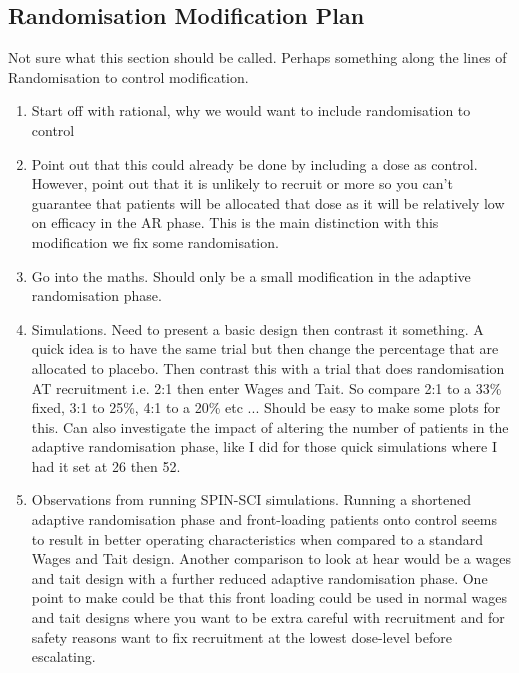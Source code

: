 
\subsection{Randomisation Modification Plan}
Not sure what this section should be called. Perhaps something along the lines of Randomisation to control modification. 

\begin{enumerate}
	\item Start off with rational, why we would want to include randomisation to control 
	\item Point out that this could already be done by including a dose as control. However, point out that it is unlikely to recruit or more so you can't guarantee that patients will be allocated that dose as it will be relatively low on efficacy in the AR phase. This is the main distinction with this modification we fix some randomisation. 
	\item Go into the maths. Should only be a small modification in the adaptive randomisation phase. 
	\item Simulations. Need to present a basic design then contrast it something. A quick idea is to have the same trial but then change the percentage that are allocated to placebo. Then contrast this with a trial that does randomisation AT recruitment i.e. 2:1 then enter Wages and Tait. So compare 2:1 to a 33\% fixed, 3:1 to 25\%, 4:1 to a 20\% etc ... Should be easy to make some plots for this. Can also investigate the impact of altering the number of patients in the adaptive randomisation phase, like I did for those quick simulations where I had it set at 26 then 52. 
	\item Observations from running SPIN-SCI simulations. Running a shortened adaptive randomisation phase and front-loading patients onto control seems to result in better operating characteristics when compared to a standard Wages and Tait design. Another comparison to look at hear would be a wages and tait design with a further reduced adaptive randomisation phase. One point to make could be that this front loading could be used in normal wages and tait designs where you want to be extra careful with recruitment and for safety reasons want to fix recruitment at the lowest dose-level before escalating. 
\end{enumerate}



